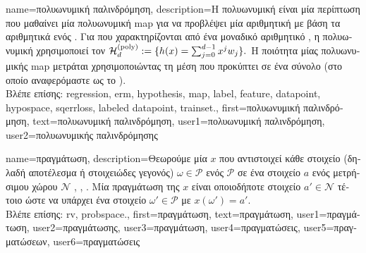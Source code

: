 {name={\foreignlanguage{greek}{πολυωνυμική παλινδρόμηση}}, 
	description={\foreignlanguage{greek}{Η πολυωνυμική} 
		 \foreignlanguage{greek}{είναι μία περίπτωση}  \foreignlanguage{greek}{που 
		μαθαίνει μία πολυωνυμική} \gls{map}  \foreignlanguage{greek}{για να προβλέψει μία αριθμητική} 
		 \foreignlanguage{greek}{με βάση τα αριθμητικά}  \foreignlanguage{greek}{ενός} 
		. \foreignlanguage{greek}{Για}  \foreignlanguage{greek}{που 
		χαρακτηρίζονται από ένα μοναδικό αριθμητικό} , 
		\foreignlanguage{greek}{η πολυωνυμική}  \foreignlanguage{greek}{χρησιμοποιεί τον}  
		$\mathcal{H}^{(\rm poly)}_{d} := \{ h(x) = \sum_{j=0}^{d-1} x^{j} w_{j} \}.$
		\foreignlanguage{greek}{Η ποιότητα μίας πολυωνυμικής} \gls{map}  \foreignlanguage{greek}{μετράται 
		χρησιμοποιώντας τη μέση}  \foreignlanguage{greek}{που προκύπτει σε ένα σύνολο} 
		 (\foreignlanguage{greek}{στο οποίο αναφερόμαστε ως το} ).\\
		\foreignlanguage{greek}{Βλέπε επίσης:} \gls{regression}, \gls{erm}, \gls{hypothesis}, \gls{map}, \gls{label}, \gls{feature}, \gls{datapoint}, 
		\gls{hypospace}, \gls{sqerrloss}, \gls{labeled datapoint}, \gls{trainset}.},
	first={\foreignlanguage{greek}{πολυωνυμική παλινδρόμηση}},
	text={\foreignlanguage{greek}{πολυωνυμική παλινδρόμηση}},
	user1={\foreignlanguage{greek}{πολυωνυμική παλινδρόμηση}}, %
	user2={\foreignlanguage{greek}{πολυωνυμικής παλινδρόμησης}} %
}

{name={\foreignlanguage{greek}{πραγμάτωση}},
	description={\foreignlanguage{greek}{Θεωρούμε μία}  $x$ 
		\foreignlanguage{greek}{που αντιστοιχεί κάθε στοιχείο (δηλαδή αποτέλεσμα ή στοιχειώδες γεγονός) 
		$\omega \in \mathcal{P}$ ενός}  $\mathcal{P}$ \foreignlanguage{greek}{σε ένα στοιχείο
		$a$ ενός μετρήσιμου χώρου} $\mathcal{N}$ \cite{RudinBookPrinciplesMatheAnalysis}, \cite{BillingsleyProbMeasure}, \cite{HalmosMeasure}. 
		\foreignlanguage{greek}{Μία πραγμάτωση της $x$ είναι οποιοδήποτε στοιχείο $a' \in \mathcal{N}$ τέτοιο ώστε να 
		υπάρχει ένα στοιχείο $\omega' \in \mathcal{P}$ με} $x(\omega') = a'$.\\
		\foreignlanguage{greek}{Βλέπε επίσης:} \gls{rv}, \gls{probspace}.}, 
	first={\foreignlanguage{greek}{πραγμάτωση}},
	text={\foreignlanguage{greek}{πραγμάτωση}},
	user1={\foreignlanguage{greek}{πραγμάτωση}}, %
  	user2={\foreignlanguage{greek}{πραγμάτωσης}}, %
	user3={\foreignlanguage{greek}{πραγμάτωση}}, %
  	user4={\foreignlanguage{greek}{πραγματώσεις}}, %
	user5={\foreignlanguage{greek}{πραγματώσεων}}, %
  	user6={\foreignlanguage{greek}{πραγματώσεις}} %
}

